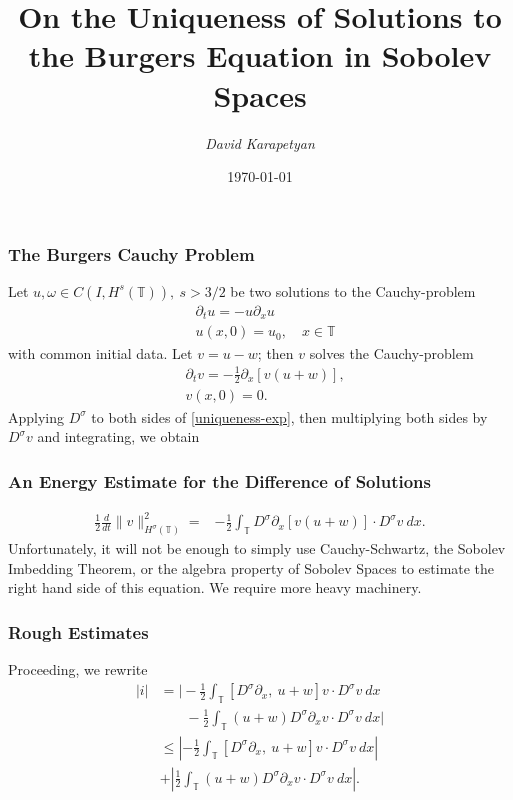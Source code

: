 \documentclass{beamer}
\newcommand{\p}{\partial}
\newcommand{\ci}{\mathbb{T}}
\begin{document}
%
%
\date{\today}
%
%
\title{On the Uniqueness of Solutions to the Burgers Equation in Sobolev Spaces}
\author{{\it David Karapetyan}}
\begin{frame}
	\titlepage
\end{frame}
%
%
%
%
%
%

%
%
\begin{frame}
	\frametitle{ The Burgers Cauchy Problem}
	
Let $u,\omega \in C(I, H^s(\ci)), \ s>3/2$ be two solutions to the
Cauchy-problem 
%
%
\begin{align}
	\label{burgers-equation}
		& \p_t u = -u \p_x u
		\\
		\label{init-cond}
		& u(x,0) = u_0, \quad x \in \ci
\end{align}
%
%
with common initial data. Let $v=u-w$; then $v$ solves the Cauchy-problem
%
%
\begin{align}
	\label{uniqueness-exp}
 & \p_t v  =  -\frac{1}{2} \p_x [v(u + w)],
\\
\label{uniqueness-init-data}
& v(x,0) = 0.
\end{align}
%
%
%
%
Applying $D^\sigma$ to both sides of \eqref{uniqueness-exp}, then 
multiplying both sides by $D^\sigma v$ and integrating, we obtain
\end{frame}
%
%
\begin{frame}
	\frametitle{An Energy Estimate for the Difference of Solutions}
%
%
\begin{equation}
\begin{split}
 \frac{1}{2} \frac{d}{dt} \|v\|_{H^\sigma(\ci)}^2
 = & -\frac{1}{2} \int_{\ci} D^\sigma \p_x [v(u+w)] \cdot
D^\sigma v \ dx.
\label{2v}
\end{split}
\end{equation}
%
%
Unfortunately, it will not be enough to simply use Cauchy-Schwartz, the 
Sobolev Imbedding Theorem, or the algebra property of Sobolev Spaces to 
estimate the right hand side of this equation. We require more heavy 
machinery. 
\end{frame}
%
%
\begin{frame}
	\frametitle{Rough Estimates}
Proceeding, we rewrite
%
%
\begin{equation}
\begin{split}
|i|  & =
\Big |
 -\frac{1}{2} \int_{\ci} \left[ D^\sigma \p_x, \ u+w \right]v \cdot
D^\sigma v \ dx 
\\
& \phantom{ \ = \Big |}- \frac{1}{2} \int_{\ci} (u+w) D^\sigma
\p_x v \cdot D^\sigma v\ dx
\Big | \\
& \le \left |
-\frac{1}{2} \int_{\ci} \left[ D^\sigma \p_x, \ u+w \right]v \cdot
D^\sigma v \ dx \right |
\\
& + \left | \frac{1}{2} \int_{\ci} (u+w) D^\sigma \p_x v
\cdot D^\sigma v\
dx \right |.
\label{4v}
\end{split}
\end{equation}
%
%
\end{frame}
\end{document}
